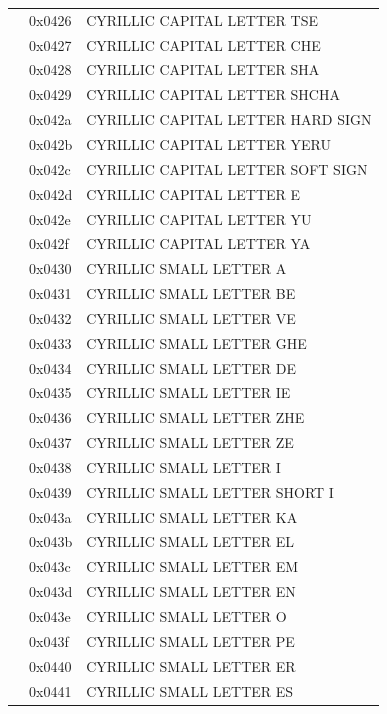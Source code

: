 \documentclass[12pt, twoside]{article}
\begin{document}
\begin{longtable}{L{1.0cm} L{2.0cm} >{\footnotesize}L{10cm}}
&0x0426&CYRILLIC CAPITAL LETTER TSE\\
&0x0427&CYRILLIC CAPITAL LETTER CHE\\
&0x0428&CYRILLIC CAPITAL LETTER SHA\\
&0x0429&CYRILLIC CAPITAL LETTER SHCHA\\
&0x042a&CYRILLIC CAPITAL LETTER HARD SIGN\\
&0x042b&CYRILLIC CAPITAL LETTER YERU\\
&0x042c&CYRILLIC CAPITAL LETTER SOFT SIGN\\
&0x042d&CYRILLIC CAPITAL LETTER E\\
&0x042e&CYRILLIC CAPITAL LETTER YU\\
&0x042f&CYRILLIC CAPITAL LETTER YA\\
&0x0430&CYRILLIC SMALL LETTER A\\
&0x0431&CYRILLIC SMALL LETTER BE\\
&0x0432&CYRILLIC SMALL LETTER VE\\
&0x0433&CYRILLIC SMALL LETTER GHE\\
&0x0434&CYRILLIC SMALL LETTER DE\\
&0x0435&CYRILLIC SMALL LETTER IE\\
&0x0436&CYRILLIC SMALL LETTER ZHE\\
&0x0437&CYRILLIC SMALL LETTER ZE\\
&0x0438&CYRILLIC SMALL LETTER I\\
&0x0439&CYRILLIC SMALL LETTER SHORT I\\
&0x043a&CYRILLIC SMALL LETTER KA\\
&0x043b&CYRILLIC SMALL LETTER EL\\
&0x043c&CYRILLIC SMALL LETTER EM\\
&0x043d&CYRILLIC SMALL LETTER EN\\
&0x043e&CYRILLIC SMALL LETTER O\\
&0x043f&CYRILLIC SMALL LETTER PE\\
&0x0440&CYRILLIC SMALL LETTER ER\\
&0x0441&CYRILLIC SMALL LETTER ES\\

\end{longtable}
\end{document}
